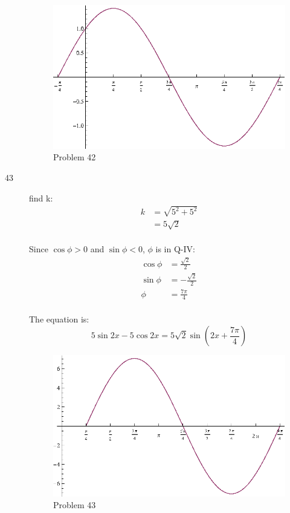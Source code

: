 \documentclass{exam}
\begin{document}
\begin{description}
        \begin{figure}[H]
          \centering
          \includegraphics[scale=0.8]{problem42.eps}
          \caption{Problem 42}
        \end{figure}

      \item[43] 
        find k:
        \begin{align*}
          k & = \sqrt{5^2 + 5^2} \\
            & = 5 \sqrt{2} \\
        \end{align*}

        Since $\cos \phi > 0$ and $\sin \phi < 0$, $\phi$ is in Q-IV:
        \begin{align*}
          \cos \phi & = \frac{\sqrt{2}}{2} \\
          \sin \phi & = - \frac{\sqrt{2}}{2} \\
          \phi      & = \frac{7 \pi}{4} \\
        \end{align*}

        The equation is:
        \[
          5 \sin 2x - 5 \cos 2x = \boxed{ 5 \sqrt{2} \sin \left( 2x + \frac{7 \pi}{4} \right) } 
        \]

        \begin{figure}[H]
          \centering
          \includegraphics[scale=0.8]{problem43.eps}
          \caption{Problem 43}
        \end{figure}


\end{description}
\end{document}
